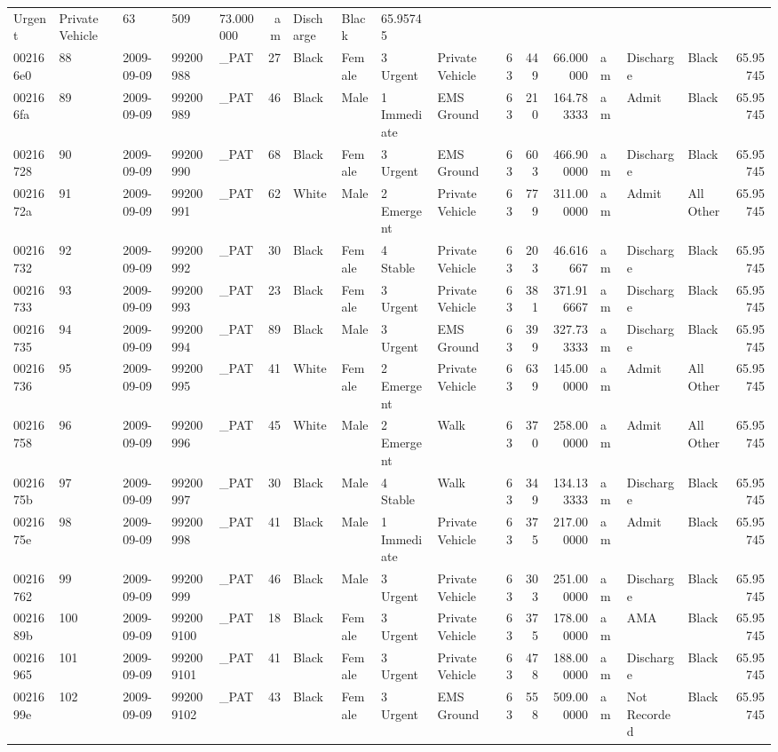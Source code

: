 \documentclass[]{elsarticle} %
\begin{document}
\begin{longtable}[]{@{}lllllrllllrrrlllr@{}}
Urgent & Private Vehicle & 63 & 509 & 73.000000 & am & Discharge & Black
& 65.95745\tabularnewline
002166e0 & 88 & 2009-09-09 & 99200988 & \_PAT & 27 & Black & Female & 3
Urgent & Private Vehicle & 63 & 449 & 66.000000 & am & Discharge & Black
& 65.95745\tabularnewline
002166fa & 89 & 2009-09-09 & 99200989 & \_PAT & 46 & Black & Male & 1
Immediate & EMS Ground & 63 & 210 & 164.783333 & am & Admit & Black &
65.95745\tabularnewline
00216728 & 90 & 2009-09-09 & 99200990 & \_PAT & 68 & Black & Female & 3
Urgent & EMS Ground & 63 & 603 & 466.900000 & am & Discharge & Black &
65.95745\tabularnewline
0021672a & 91 & 2009-09-09 & 99200991 & \_PAT & 62 & White & Male & 2
Emergent & Private Vehicle & 63 & 779 & 311.000000 & am & Admit & All
Other & 65.95745\tabularnewline
00216732 & 92 & 2009-09-09 & 99200992 & \_PAT & 30 & Black & Female & 4
Stable & Private Vehicle & 63 & 203 & 46.616667 & am & Discharge & Black
& 65.95745\tabularnewline
00216733 & 93 & 2009-09-09 & 99200993 & \_PAT & 23 & Black & Female & 3
Urgent & Private Vehicle & 63 & 381 & 371.916667 & am & Discharge &
Black & 65.95745\tabularnewline
00216735 & 94 & 2009-09-09 & 99200994 & \_PAT & 89 & Black & Male & 3
Urgent & EMS Ground & 63 & 399 & 327.733333 & am & Discharge & Black &
65.95745\tabularnewline
00216736 & 95 & 2009-09-09 & 99200995 & \_PAT & 41 & White & Female & 2
Emergent & Private Vehicle & 63 & 639 & 145.000000 & am & Admit & All
Other & 65.95745\tabularnewline
00216758 & 96 & 2009-09-09 & 99200996 & \_PAT & 45 & White & Male & 2
Emergent & Walk & 63 & 370 & 258.000000 & am & Admit & All Other &
65.95745\tabularnewline
0021675b & 97 & 2009-09-09 & 99200997 & \_PAT & 30 & Black & Male & 4
Stable & Walk & 63 & 349 & 134.133333 & am & Discharge & Black &
65.95745\tabularnewline
0021675e & 98 & 2009-09-09 & 99200998 & \_PAT & 41 & Black & Male & 1
Immediate & Private Vehicle & 63 & 375 & 217.000000 & am & Admit & Black
& 65.95745\tabularnewline
00216762 & 99 & 2009-09-09 & 99200999 & \_PAT & 46 & Black & Male & 3
Urgent & Private Vehicle & 63 & 303 & 251.000000 & am & Discharge &
Black & 65.95745\tabularnewline
0021689b & 100 & 2009-09-09 & 992009100 & \_PAT & 18 & Black & Female &
3 Urgent & Private Vehicle & 63 & 375 & 178.000000 & am & AMA & Black &
65.95745\tabularnewline
00216965 & 101 & 2009-09-09 & 992009101 & \_PAT & 41 & Black & Female &
3 Urgent & Private Vehicle & 63 & 478 & 188.000000 & am & Discharge &
Black & 65.95745\tabularnewline
0021699e & 102 & 2009-09-09 & 992009102 & \_PAT & 43 & Black & Female &
3 Urgent & EMS Ground & 63 & 558 & 509.000000 & am & Not Recorded &
Black & 65.95745\tabularnewline

\end{longtable}
\end{document}
